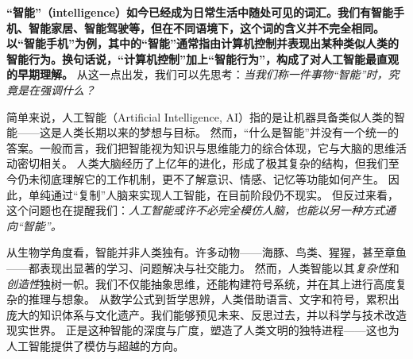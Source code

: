 \textbf{“智能”（intelligence）如今已经成为日常生活中随处可见的词汇。我们有智能手机、智能家居、智能驾驶等，但在不同语境下，这个词的含义并不完全相同。以“智能手机”为例，其中的“智能”通常指由计算机控制并表现出某种类似人类的智能行为。换句话说，“计算机控制”加上“智能行为”，构成了对人工智能最直观的早期理解。}
从这一点出发，我们可以先思考：\emph{当我们称一件事物“智能”时，究竟是在强调什么？}


简单来说，人工智能（Artificial Intelligence, AI）指的是让机器具备类似人类的智能——这是人类长期以来的梦想与目标。
然而，“什么是智能”并没有一个统一的答案。一般而言，我们把智能视为知识与思维能力的综合体现，它与大脑的思维活动密切相关。
人类大脑经历了上亿年的进化，形成了极其复杂的结构，但我们至今仍未彻底理解它的工作机制，更不了解意识、情感、记忆等功能如何产生。
因此，单纯通过“复制”人脑来实现人工智能，在目前阶段仍不现实。
但反过来看，这个问题也在提醒我们：\emph{人工智能或许不必完全模仿人脑，也能以另一种方式通向“智能”。}


从生物学角度看，智能并非人类独有。许多动物——海豚、鸟类、猩猩，甚至章鱼——都表现出显著的学习、问题解决与社交能力。
然而，人类智能以其\emph{复杂性}和\emph{创造性}独树一帜。我们不仅能抽象思维，还能构建符号系统，并在其上进行高度复杂的推理与想象。
从数学公式到哲学思辨，人类借助语言、文字和符号，累积出庞大的知识体系与文化遗产。我们能够预见未来、反思过去，并以科学与技术改造现实世界。
正是这种智能的深度与广度，塑造了人类文明的独特进程——这也为人工智能提供了模仿与超越的方向。

